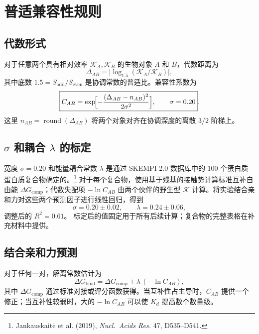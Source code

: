 \documentclass[12pt,a4paper]{article}
\newcommand{\REL}{\mathcal{K}}          %
\begin{document}
	\section{普适兼容性规则}
	\label{sec:compatibility}
	
	\subsection{代数形式}
	对于任意两个具有相对效率 \(\REL_A,\REL_B\) 的生物对象 \(A\) 和 \(B\)，代数距离为
	\[
	\Delta_{AB} = \bigl|\log_{1.5}(\REL_A/\REL_B)\bigr|,
	\]
	其中底数 \(1.5 = S_{\mathrm{odd}}/S_{\mathrm{even}}\) 是协调常数的普适比。兼容性系数为
	\begin{equation}
		\boxed{C_{AB} = \exp\!\Bigl[-\frac{(\Delta_{AB}-n_{AB})^2}{2\sigma^2}\Bigr],\qquad \sigma = 0.20}.
		\label{eq:Cab}
	\end{equation}
	这里 \(n_{AB} = \operatorname{round}(\Delta_{AB})\) 将两个对象对齐在协调深度的离散 \(3/2\) 阶梯上。
	
	\subsection{\(\sigma\) 和耦合 \(\lambda\) 的标定}
	宽度 \(\sigma = 0.20\) 和能量耦合常数 \(\lambda\) 是通过 SKEMPI 2.0 数据库中的 100 个蛋白质–蛋白质复合物确定的。\footnote{Jankauskaitė et al. (2019), \emph{Nucl.\ Acids Res.} 47, D535–D541.} 对于每个复合物，使用基于残基的接触势计算标准互补自由能 \(\Delta G_{\mathrm{comp}}\)；代数失配项 \(-\ln C_{AB}\) 由两个伙伴的野生型 \(\REL\) 计算。将实验结合亲和力对这些两个预测因子进行线性回归，得到
	\[
	\sigma = 0.20 \pm 0.02,\qquad \lambda = 0.24 \pm 0.06,
	\]
	调整后的 \(R^2 = 0.61\)。
	标定后的值固定用于所有后续计算；复合物的完整表格在补充材料中提供。
	
	\subsection{结合亲和力预测}
	对于任何一对，解离常数估计为
	\[
	\Delta G_{\mathrm{bind}} = \Delta G_{\mathrm{comp}} + \lambda\,(-\ln C_{AB}),
	\label{eq:Kd}
	\]
	其中 \(\Delta G_{\mathrm{comp}}\) 通过标准对接或评分函数获得。当互补性占主导时，\(C_{AB}\) 提供一个修正；当互补性较弱时，大的 \(-\ln C_{AB}\) 可以使 \(K_d\) 提高数个数量级。
	
\end{document}
